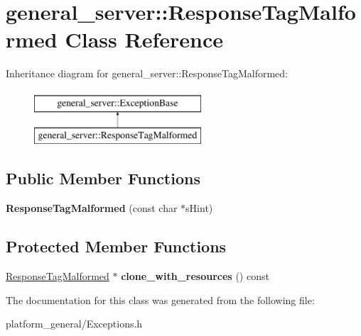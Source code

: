 \hypertarget{classgeneral__server_1_1ResponseTagMalformed}{\section{general\-\_\-server\-:\-:\-Response\-Tag\-Malformed \-Class \-Reference}
\label{classgeneral__server_1_1ResponseTagMalformed}
}
\-Inheritance diagram for general\-\_\-server\-:\-:\-Response\-Tag\-Malformed\-:\begin{figure}[H]
\begin{center}
\leavevmode
\includegraphics[height=2.000000cm]{classgeneral__server_1_1ResponseTagMalformed}
\end{center}
\end{figure}
\subsection*{\-Public \-Member \-Functions}
\begin{DoxyCompactItemize}
\item 
\hypertarget{classgeneral__server_1_1ResponseTagMalformed_a02ab820918e0fb532bf017ba9998ebfe}{{\bfseries \-Response\-Tag\-Malformed} (const char $\ast$s\-Hint)}\label{classgeneral__server_1_1ResponseTagMalformed_a02ab820918e0fb532bf017ba9998ebfe}

\end{DoxyCompactItemize}
\subsection*{\-Protected \-Member \-Functions}
\begin{DoxyCompactItemize}
\item 
\hypertarget{classgeneral__server_1_1ResponseTagMalformed_a0584776c35fe31fb88801ffd2362b10f}{\hyperlink{classgeneral__server_1_1ResponseTagMalformed}{\-Response\-Tag\-Malformed} $\ast$ {\bfseries clone\-\_\-with\-\_\-resources} () const }\label{classgeneral__server_1_1ResponseTagMalformed_a0584776c35fe31fb88801ffd2362b10f}

\end{DoxyCompactItemize}


\-The documentation for this class was generated from the following file\-:\begin{DoxyCompactItemize}
\item 
platform\-\_\-general/\-Exceptions.\-h\end{DoxyCompactItemize}
